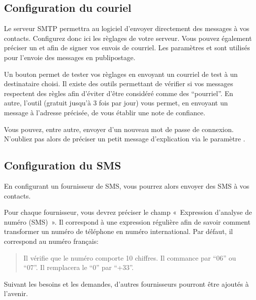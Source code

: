 \documentclass[letterpaper,10pt,french]{sphinxmanual}
\begin{document}
\subsection{Configuration du couriel}
\label{\detokenize{mailing/configuration:configuration-du-couriel}}
Le serveur SMTP permettra au logiciel d’envoyer directement des messages à vos contacts.
Configurez donc ici les règlages de votre serveur.
Vous pouvez également préciser un  et  afin de signer vos envois de courriel.
Les paramètres  et  sont utilisés pour l’envoie des messages en publipostage.

Un bouton  permet de tester vos règlages en envoyant un courriel de test à un destinataire choisi.
Il existe des outils permettant de vérifier si vos messages respectent des règles afin d’éviter d’être considéré comme des “pourriel”.
En autre, l’outil  (gratuit jusqu’à 3 fois par jour) vous permet, en envoyant un message à l’adresse précisée, de vous établir une note de confiance.

Vous pouvez, entre autre, envoyer d’un nouveau mot de passe de connexion.
N’oubliez pas alors de préciser un petit message d’explication via le paramètre .


\subsection{Configuration du SMS}
\label{\detokenize{mailing/configuration:configuration-du-sms}}
En configurant un fournisseur de SMS, vous pourrez alors envoyer des SMS à vos contacts.

Pour chaque fournisseur, vous devrez préciser le champ « Expression d’analyse de numéro (SMS) ».
Il correspond à une expression régulière afin de savoir comment transformer un numéro de téléphone en numéro international.
Par défaut, il correspond au numéro français: 
\begin{quote}

Il vérifie que le numéro comporte 10 chiffres.
Il commance par “06” ou “07”.
Il remplacera le “0” par “+33”.
\end{quote}

Suivant les besoins et les demandes, d’autres fournisseurs pourront être ajoutés à l’avenir.
\end{document}
